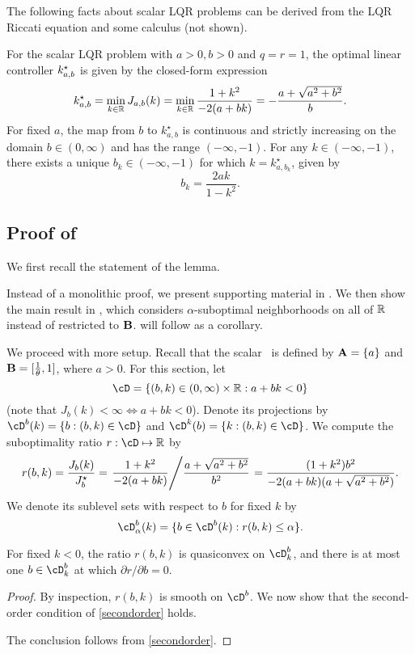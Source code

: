 \noindent The following facts about scalar LQR problems can be derived from
the LQR Riccati equation and some calculus (not shown).
\begin{lemma}
\label{lem:scalar-lqr-facts}
For the scalar LQR problem with $a > 0, b > 0$ and $q = r = 1$,
the optimal linear controller $k^\star_{a,b}$ is given by the closed-form expression
	\[
		k^\star_{a,b}
		=
		\min_{k \in \mathbb{R}} J_{a,b}(k)
		=
		\min_{k \in \mathbb{R}} \frac{1 + k^2}{-2(a + bk)}
		=
		-\frac{a + \sqrt{a^2 + b^2}}{b}.
	\]
For fixed $a$, the map from $b$ to $k^\star_{a,b}$
is continuous and strictly increasing on the domain $b \in (0, \infty)$
and has the range $(-\infty, -1)$.
For any $k \in (-\infty, -1)$,
there exists a unique $b_k \in (-\infty, -1)$
for which $k = k^\star_{a,b_k}$, given by
\[
	b_k = \frac{2ak}{1 - k^2}.
\]
\end{lemma}

\newcommand{\bkdomain}{\cD}
\newcommand{\bdomain}{\cD^b}
\newcommand{\kdomain}{\cD^k}

\subsection{Proof of }

We first recall the statement of the lemma.
\quasi*

\noindent Instead of a monolithic proof,
we present supporting material in .
We then show the main result in ,
which considers $\alpha$-suboptimal neighborhoods on all of $\mathbb{R}$
instead of restricted to $\mathbf{B}$.
 will follow as a corollary.

We proceed with more setup.
Recall that the scalar \DDFproblem\ is defined by
$\mathbf{A} = \{a\}$ and $\mathbf{B} = [\frac{1}{\theta}, 1]$, where $a > 0$.
For this section,
let
\[
	\bkdomain
	= \{ (b, k) \in (0, \infty) \times \R : a + bk < 0 \}
\]
(note that $J_b(k) < \infty \iff a + bk < 0$).
Denote its projections by
$\bdomain(k) = \{ b: (b, k) \in \bkdomain \}$
and
$\kdomain(b) = \{ k: (b, k) \in \bkdomain \}$.
We compute the suboptimality ratio $r : \bkdomain \mapsto \R$ by
\[
	r(b, k) =
	\frac{J_b(k)}{J^\star_b}
	=
	\left. 
		\frac{
			1 + k^2
		}{
			-2(a + bk)
		}
	 \middle/ 
		\frac{
			a + \sqrt{a^2 + b^2}
		}{
			b^2
		}
	 \right.
	=
	\frac{
		(1 + k^2) b^2
	}{
		-2(a + bk)(a + \sqrt{a^2 + b^2})
	}.
\]
We denote its sublevel sets with respect to $b$ for fixed $k$ by
\[
	\bdomain_\alpha(k) = \{ b \in \bdomain(k) : r(b, k) \leq \alpha \}.
\]
\begin{lemma}
\label{lem:ratio-quasi}
	For fixed $k < 0$, the ratio $r(b, k)$ is quasiconvex on $\bdomain_k$,
	and there is at most one $b \in \bdomain_k$ at which $\partial r / \partial b = 0$.
\end{lemma}
\begin{proof}
	By inspection, $r(b, k)$ is smooth on $\bdomain$.
	We now show that the second-order condition of \ref{secondorder} holds.
	
	The conclusion follows from \ref{secondorder}.
\end{proof}

